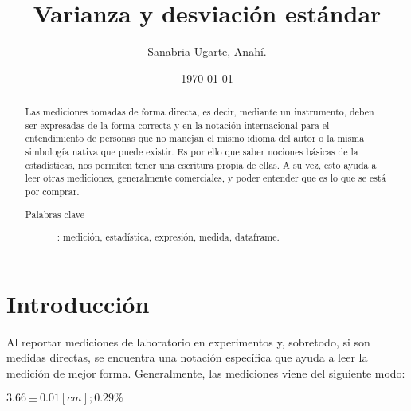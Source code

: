 \documentclass[%
 reprint,
groupedaddress,
unsortedaddress,
 amsmath,amssymb,
 aps,
superscriptaddress
]{revtex4-2}
\begin{document}

\title{Varianza y desviación estándar}%

\author{Sanabria Ugarte, Anahí.}



\date{\today}%

\begin{abstract}

Las mediciones tomadas de forma directa, es decir, mediante un instrumento, deben ser expresadas de la forma correcta y en la notación internacional para el entendimiento de personas que no manejan el mismo idioma del autor o la misma simbología nativa que puede existir. Es por ello que saber nociones básicas de la estadísticas, nos permiten tener una escritura propia de ellas. A su vez, esto ayuda a leer otras mediciones, generalmente comerciales, y poder entender que es lo que se está por comprar.

\begin{description}
\item[Palabras clave]: medición, estadística, expresión, medida, dataframe.
\end{description}
\end{abstract}

\maketitle


\section{Introducción}
\label{sec:introduccion}

Al reportar mediciones de laboratorio en experimentos y, sobretodo, si son medidas directas, se encuentra una notación específica que ayuda a leer la medición de mejor forma. Generalmente, las mediciones viene del siguiente modo:

\begin{center} {$3.66 \pm 0.01 [cm] ; 0.29\%$} \end{center}
\end{document}
